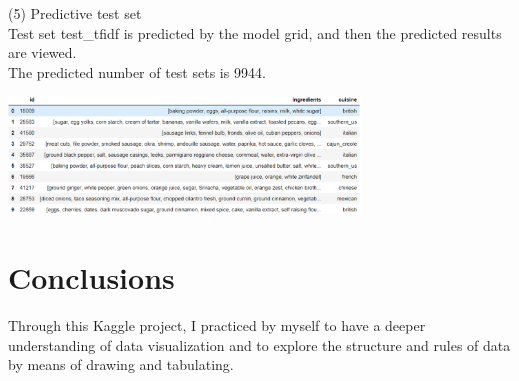 (5)  Predictive test set\\
    Test set test_tfidf is predicted by the model grid, and then the predicted results are viewed.\\
    The predicted number of test sets is 9944.
    \begin{center}
      \begin{minipage}{1\linewidth}
       \centering
       \includegraphics[width=0.7\textwidth]{pic01/result.eps}
      \end{minipage}

      \hfill
    \end{center}

  


\section{Conclusions}

Through this Kaggle project, I practiced by myself to have a deeper understanding of data visualization and to explore the structure and rules of data by means of drawing and tabulating.
